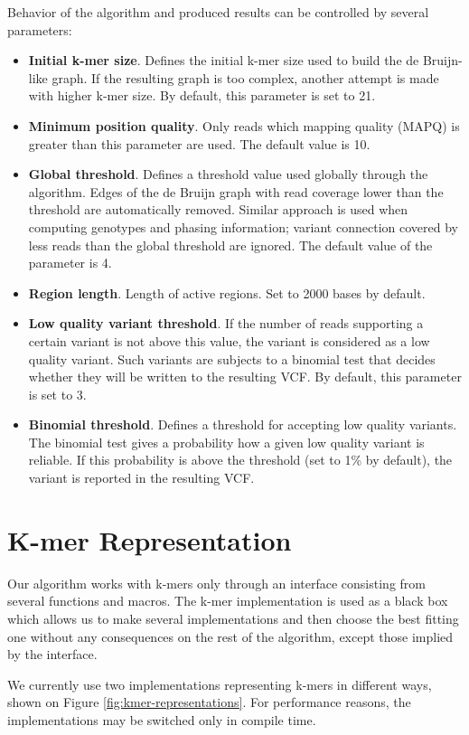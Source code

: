 Behavior of the algorithm and produced results can be controlled by several parameters:
\begin{itemize}
\item \textbf{Initial k-mer size}. Defines the initial k-mer size used to build the de Bruijn-like graph. If the resulting graph is too complex, another attempt is made with higher k-mer size. By default, this parameter is set to 21.
\item \textbf{Minimum position quality}. Only reads which mapping quality (MAPQ) is greater than this parameter are used. The default value is 10.
\item \textbf{Global threshold}. Defines a threshold value used globally through the algorithm. Edges of the de Bruijn graph with read coverage lower than the threshold are automatically removed. Similar approach is used when computing genotypes and phasing information; variant connection covered by less reads than the global threshold are ignored. The default value of the parameter is 4.
\item \textbf{Region length}. Length of active regions. Set to 2000 bases by default.
\item \textbf{Low quality variant threshold}. If the number of reads supporting a certain variant is not above this value, the variant is considered as a low quality variant. Such variants are subjects to a binomial test that decides whether they will be written to the resulting VCF. By default, this parameter is set to 3.
\item \textbf{Binomial threshold}. Defines a threshold for accepting low quality variants. The binomial test gives a probability how a given low quality variant is reliable. If this probability is above the threshold (set to 1\% by default), the variant is reported in the resulting VCF.
\end{itemize}

\section{K-mer Representation}
\label{sec:kmer-representation}

Our algorithm works with k-mers only through an interface consisting from several functions and macros. The k-mer implementation is used as a black box which allows us to make several implementations and then choose the best fitting one without any consequences on the rest of the algorithm, except those implied by the interface.

We currently use two implementations representing k-mers in different ways, shown on Figure \ref{fig:kmer-representations}. For performance reasons, the implementations may be switched only in compile time. 

